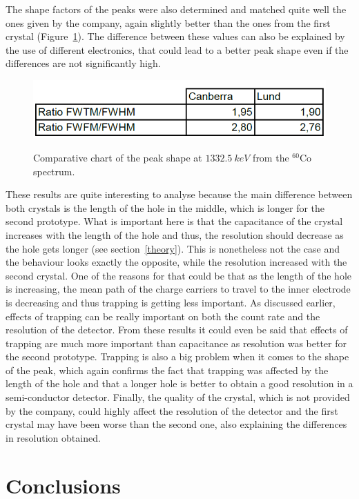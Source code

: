 \documentclass[11pt,a4paper]{article}
\begin{document}
The shape factors of the peaks were also determined and matched quite well the ones given by the company, again slightly better than the ones from the first crystal (Figure~\ref{shape2}). The difference between these values can also be explained by the use of different electronics, that could lead to a better peak shape even if the differences are not significantly high.

\begin{figure}[!h]
\centering
\caption{Comparative chart of the peak shape at $1332.5~keV$ from the $^{60}$Co spectrum.}
\includegraphics[scale=0.7]{shape.png}
\label{shape2}
\end{figure}
These results are quite interesting to analyse because the main difference between both crystals is the length of the hole in the middle, which is longer for the second prototype. What is important here is that the capacitance of the crystal increases with the length of the hole and thus, the resolution should decrease as the hole gets longer (see section~\ref{theory}). This is nonetheless not the case and the behaviour looks exactly the opposite, while the resolution increased with the second crystal. One of the reasons for that could be that as the length of the hole is increasing, the mean path of the charge carriers to travel to the inner electrode is decreasing and thus trapping is getting less important. As discussed earlier, effects of trapping can be really important on both the count rate and the resolution of the detector. From these results it could even be said that effects of trapping are much more important than capacitance as resolution was better for the second prototype. Trapping is also a big problem when it comes to the shape of the peak, which again confirms the fact that trapping was affected by the length of the hole and that a longer hole is better to obtain a good resolution in a semi-conductor detector. Finally, the quality of the crystal, which is not provided by the company, could highly affect the resolution of the detector and the first crystal may have been worse than the second one, also explaining the differences in resolution obtained.

\section{Conclusions}



\newpage



\end{document}

